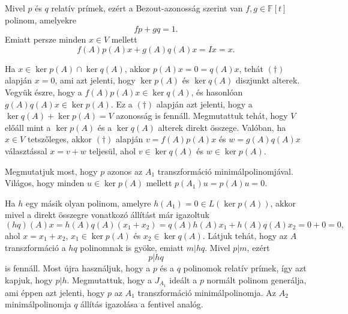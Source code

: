 \documentclass[a4paper, showtrims]{memoir}
\makeatletter
\renewenvironment{proof}[1][\proofname]
    {\par\pushQED{\qed}%
    \normalfont \topsep6\p@\@plus6\p@\relax
    \trivlist
    \item[\hskip\labelsep
        \itshape
    #1\@addpunct{:}]\ignorespaces}
    {\popQED\endtrivlist\@endpefalse}
\theoremstyle{plain}
\theoremstyle{remark}
\theoremstyle{definition}
\makeatother
\begin{document}
\begin{proof}
	Mivel $p$ és $q$ relatív prímek, ezért a Bezout-azonosság szerint van $f,g\in\mathbb{F}\left[ t \right]$ polinom, amelyekre
	\[
		fp+gq=1.
	\]
	Emiatt persze minden $x\in V$ mellett
	\[
		f\left( A \right)p\left( A \right)x
		+
		g\left( A \right)q\left( A \right)x=Ix=x.\tag{\dag}
	\]

	Ha $x\in\ker p\left( A \right)\cap\ker q\left( A \right)$,
	akkor
	$p\left( A \right)x=0=q\left( A \right)x$, tehát $(\dag)$ alapján $x=0$, ami azt jelenti, hogy
	$\ker p\left( A \right)$ és
	$\ker q\left( A \right)$ diszjunkt alterek.
	\\
	Vegyük észre, hogy a
	$f\left( A \right)p\left( A \right)x\in\ker q\left( A \right)$,
	és hasonlóan
	$g\left( A \right)q\left( A \right)x\in\ker p\left( A \right)$.
	Ez a $(\dag)$ alapján azt jelenti, 
    hogy a $\ker q\left( A \right)+\ker p\left( A \right)=V$ azonosság is fennáll.
	Megmutattuk tehát, hogy $V$ előáll mint a $\ker p\left( A \right)$ és a
	$\ker q\left( A \right)$ alterek direkt összege.
    Valóban, ha $x\in V$ tetszőleges, akkor $(\dag)$ alapján $v=f\left( A \right)p\left( A \right)x$ 
    és $w=g\left( A \right)q\left( A \right)x$ választással $x=v+w$ teljesül,
    ahol $v\in\ker q\left( A \right)$ és $w\in\ker p\left( A \right)$.

    Megmutatjuk most, hogy $p$ azonos az $A_1$ transzformáció minimálpolinomjával.
	Világos, hogy minden $u\in\ker p\left( A \right)$ mellett
	$p\left( A_1 \right)u
		=
		p\left( A \right)u=0$.

	Ha $h$ egy másik olyan polinom, amelyre $h\left( A_1 \right)=0\in L\left( \ker p\left( A \right) \right)$,
	akkor mivel a direkt összegre vonatkozó állítást már igazoltuk
	\[
		(hq)\left( A \right)x=
		h\left( A \right)q\left( A \right)\left( x_1+x_2 \right)
		=
		q\left( A \right)h\left( A \right)x_1
		+
		h\left( A \right)q\left( A \right)x_2
		=0+0
		=0,
	\]
	ahol $x=x_1+x_2$, $x_1\in \ker p\left( A \right)$ és
	$x_2\in\ker q\left( A \right)$.
	Látjuk tehát, hogy az $A$ transzformáció a $hq$ polinomnak is gyöke,
	emiatt $m|hq$.
	Mivel $p|m$, ezért
	\[p|hq\] is fennáll.
	Most újra használjuk, hogy a $p$ és a $q$ polinomok relatív prímek,
	így azt kapjuk, hogy $p|h.$
	Megmutattuk, hogy a $J_{A_1}$ ideált a $p$ normált polinom generálja,
	ami éppen azt jelenti, hogy $p$ az $A_1$ transzformáció minimálpolinomja.
	Az $A_2$ minimálpolinomja $q$ állítás igazolása a fentivel analóg.
\end{proof}
\end{document}
